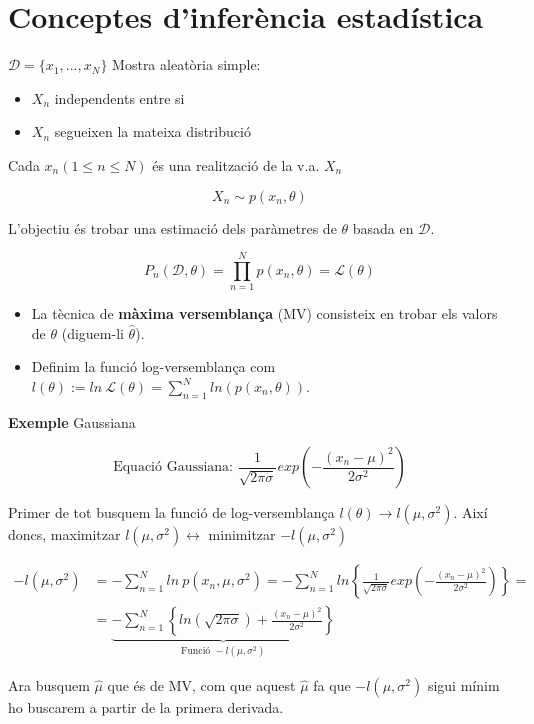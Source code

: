 \section{Conceptes d'inferència estadística}

$ \mathcal{D} = \{ x_1, ... , x_N \} $ Mostra aleatòria simple:
\begin{itemize}
	\item $X_n$ independents entre si
	\item $X_n$ segueixen la mateixa distribució
\end{itemize}

Cada $x_n (1 \le n \le N)$ és una realització de la v.a. $X_n$

\[ X_n \sim p(x_n, \theta) \]

L'objectiu és trobar una estimació dels paràmetres de $\theta$ basada en $\mathcal{D}$. 

\[ P_n(\mathcal{D}, \theta) = \prod_{n=1}^N p(x_n, \theta) = \mathcal{L}(\theta) \]



\begin{itemize}
	\item La tècnica de \textbf{màxima versemblança} (MV) consisteix en trobar els valors de $\theta$ (diguem-li  $\hat{\theta}$).
	
	\item Definim la funció log-versemblança com $l(\theta) := ln\ \mathcal{L}(\theta) = \sum_{n=1}^{N} ln(p(x_n, \theta))$. 
\end{itemize}
	
\textbf{Exemple} Gaussiana

$$
\text{Equació Gaussiana: } \frac{1}{\sqrt{2\pi\sigma}} exp\left(-\frac{(x_n - \mu)^2}{2\sigma^2}\right)
$$

Primer de tot busquem la funció de log-versemblança $l(\theta) \rightarrow l(\mu, \sigma^2)$. Així doncs, maximitzar $l(\mu, \sigma^2) \leftrightarrow$ minimitzar $-l(\mu, \sigma^2)$

\begin{align*}
	-l(\mu, \sigma^2) &= -\sum_{n=1}^N ln\ p(x_n, \mu, \sigma^2) =  
	-\sum_{n=1}^N ln\left\{ \frac{1}{\sqrt{2\pi\sigma}} exp\left(-\frac{(x_n - \mu)^2}{2\sigma^2}\right) \right\} = \\
	&= \underbrace{\boxed{-\sum_{n=1}^N \left\{ ln(\sqrt{2\pi\sigma}) + 
	\frac{(x_n - \mu)^2}{2\sigma^2} \right\}} }_{\text{Funció } -l(\mu, \sigma^2)}
\end{align*}

Ara busquem $\hat{\mu}$ que és de MV, com que aquest $\hat{\mu}$ fa que $-l(\mu, \sigma^2)$ sigui mínim ho buscarem a partir de la primera derivada.

